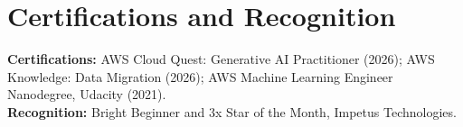 \section{Certifications and Recognition}
\textbf{Certifications:} AWS Cloud Quest: Generative AI Practitioner (2026);
AWS Knowledge: Data Migration (2026); AWS Machine Learning Engineer Nanodegree,
Udacity (2021).\\
\textbf{Recognition:} Bright Beginner and 3x Star of the Month, Impetus Technologies.
